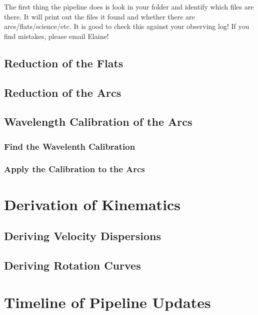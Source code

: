 \documentclass[12pt]{report}
\begin{document}
\noindent The first thing the pipeline does is look in your folder and identify which files are there. It will print out the files it found and whether there are arcs/flats/science/etc. It is good to check this against your observing log! If you find mistakes, please email Elaine!

\section{Reduction of the Flats}
\section{Reduction of the Arcs}
\section{Wavelength Calibration of the Arcs}
\subsection{Find the Wavelenth Calibration}
\subsection{Apply the Calibration to the Arcs}




\chapter{Derivation of Kinematics}

\section{Deriving Velocity Dispersions}
\section{Deriving Rotation Curves}

\chapter{Timeline of Pipeline Updates}


\end{document}
